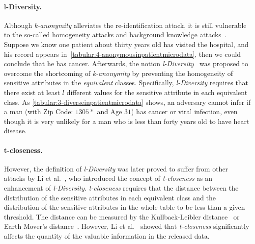 \paragraph{l-Diversity.}
Although \textit{k-anonymity} alleviates the re-identification attack, it is still vulnerable to the so-called homogeneity attacks and background knowledge attacks~\cite{machanavajjhala2007diversity}. Suppose we know one patient about thirty years old has visited the hospital, and his record appears in~\autoref{tabular:4-anonymousinpatientmicrodata}, then we could conclude that he has cancer. Afterwards, the notion \textit{l-Diversity}~\cite{machanavajjhala2007diversity} was proposed to overcome the shortcoming of \textit{k-anonymity} by preventing the homogeneity of sensitive attributes in the \textit{equivalent} classes. Specifically, \textit{l-Diversity} requires that there exist at least $l$ different values for the sensitive attribute in each equivalent class. As \autoref{tabular:3-diverseinpatientmicrodata} shows, an adversary cannot infer if a man (with Zip Code: $1305*$ and Age $31$) has cancer or viral infection, even though it is very unlikely for a man who is less than forty years old to have heart disease.

\paragraph{t-closeness.}
However, the definition of \textit{l-Diversity} was later proved to suffer from other attacks by Li et al.~\cite{li2007t}, who introduced the concept of \textit{t-closeness} as an enhancement of \textit{l-Diversity}. \textit{t-closeness} requires that the distance between the distribution of the sensitive attributes in each equivalent class and the distribution of the sensitive attributes in the whole table to be less than a given threshold. The distance can be measured by the Kullback-Leibler distance~\cite{kullback1951information} or Earth Mover's distance~\cite{rubner2000earth}. However, Li et al.~\cite{li2009closeness} showed that \textit{t-closeness} significantly affects the quantity of the valuable information in the released data.

